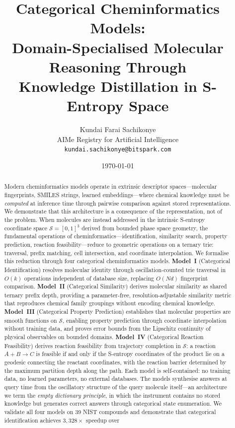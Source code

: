 \documentclass[11pt,twocolumn,a4paper]{article}
\theoremstyle{definition}
\theoremstyle{remark}
\newcommand{\Sspace}{\mathcal{S}}
\begin{document}
\title{\textbf{Categorical Cheminformatics Models: \\
Domain-Specialised Molecular Reasoning Through \\
Knowledge Distillation in S-Entropy Space}}

\author{
Kundai Farai Sachikonye\\[0.3em]
AIMe Registry for Artificial Intelligence\\[0.3em]
\texttt{kundai.sachikonye@bitspark.com}
}

\date{\today}

\maketitle

\begin{abstract}
Modern cheminformatics models operate in extrinsic descriptor spaces---molecular fingerprints, SMILES strings, learned embeddings---where chemical knowledge must be \emph{computed} at inference time through pairwise comparison against stored representations. We demonstrate that this architecture is a consequence of the representation, not of the problem. When molecules are instead addressed in the intrinsic S-entropy coordinate space $\Sspace = [0,1]^3$ derived from bounded phase space geometry, the fundamental operations of cheminformatics---identification, similarity search, property prediction, reaction feasibility---reduce to geometric operations on a ternary trie: traversal, prefix matching, cell intersection, and coordinate interpolation. We formalise this reduction through four categorical cheminformatics models. \textbf{Model~I} (Categorical Identification) resolves molecular identity through oscillation-counted trie traversal in $O(k)$ operations independent of database size, replacing $O(Nd)$ fingerprint comparison. \textbf{Model~II} (Categorical Similarity) derives molecular similarity as shared ternary prefix depth, providing a parameter-free, resolution-adjustable similarity metric that reproduces chemical family groupings without encoding chemical knowledge. \textbf{Model~III} (Categorical Property Prediction) establishes that molecular properties are smooth functions on $\Sspace$, enabling property prediction through coordinate interpolation without training data, and proves error bounds from the Lipschitz continuity of physical observables on bounded domains. \textbf{Model~IV} (Categorical Reaction Feasibility) derives reaction feasibility from trajectory completion in $\Sspace$: a reaction $A + B \to C$ is feasible if and only if the S-entropy coordinates of the product lie on a geodesic connecting the reactant coordinates, with the reaction barrier determined by the maximum partition depth along the path. Each model is self-contained: no training data, no learned parameters, no external databases. The models synthesise answers at query time from the oscillatory structure of the query molecule itself---an architecture we term the \emph{empty dictionary principle}, in which the instrument contains no stored knowledge but generates correct answers through categorical state enumeration. We validate all four models on 39 NIST compounds and demonstrate that categorical identification achieves $3{,}328\times$ speedup over 
\end{abstract}
\end{document}
